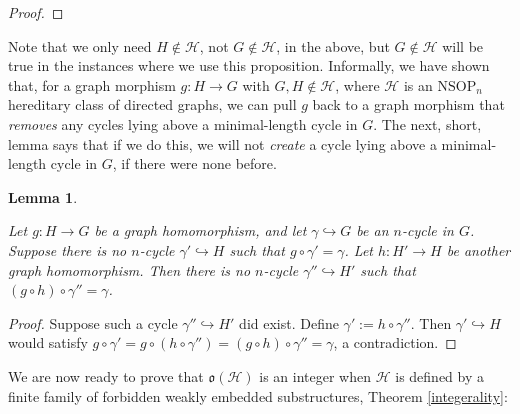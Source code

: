 \documentclass{amsart}
\newtheorem{lemma}[theorem]{Lemma}
\theoremstyle{definition}
\theoremstyle{remark}
\numberwithin{equation}{section}
\begin{document}
\begin{proof}
\end{proof}

Note that we only need $H \notin \mathcal{H}$, not $G \notin \mathcal{H}$, in the above, but $G \notin \mathcal{H}$ will be true in the instances where we use this proposition. Informally, we have shown that, for a graph morphism $g: H \to G$ with $G, H \notin \mathcal{H}$, where $\mathcal{H}$ is an $\mathrm{NSOP}_{n}$ hereditary class of directed graphs, we can pull $g$ back to a graph morphism that \textit{removes} any cycles lying above a minimal-length cycle in $G$. The next, short, lemma says that if we do this, we will not \textit{create} a cycle lying above a minimal-length cycle in $G$, if there were none before.

\begin{lemma}\label{pulling back does not create cycles}

Let $g: H \to G$ be a graph homomorphism, and let $\gamma \hookrightarrow G$ be an $n$-cycle in $G$. Suppose there is no $n$-cycle $\gamma' \hookrightarrow H$ such that $g \circ \gamma' = \gamma$. Let $h: H' \to H$ be another graph homomorphism. Then there is no $n$-cycle $\gamma'' \hookrightarrow H'$ such that $(g \circ h) \circ \gamma'' = \gamma$.

    
\end{lemma}

\begin{proof}
    Suppose such a cycle $\gamma'' \hookrightarrow H'$ did exist. Define $\gamma' := h \circ \gamma''$. Then $\gamma' \hookrightarrow H$ would satisfy $g \circ \gamma'= g \circ ( h \circ \gamma'')  = (g \circ h) \circ \gamma'' = \gamma$, a contradiction.
\end{proof}

We are now ready to prove that $\mathfrak{o}(\mathcal{H})$ is an integer when $\mathcal{H}$ is defined by a finite family of forbidden weakly embedded substructures, Theorem \ref{integerality}:
\end{document}
